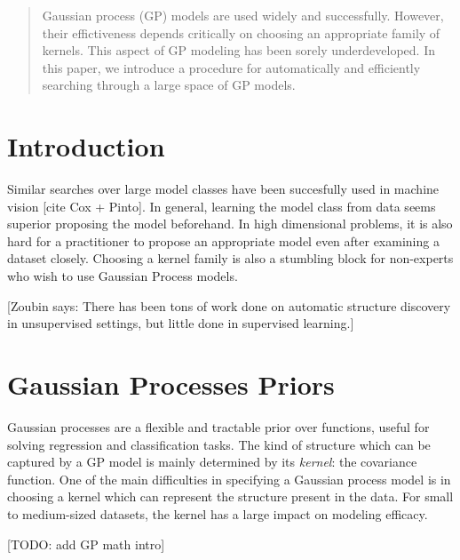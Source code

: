 \documentclass[twoside]{article}
\begin{document}


\begin{abstract}
Gaussian process (GP) models are used widely and successfully.  However, their effictiveness depends critically on choosing an appropriate family of kernels.  This aspect of GP modeling has been sorely underdeveloped.  In this paper, we introduce a procedure for automatically and efficiently searching through a large space of GP models.
\end{abstract}

\section{Introduction}

Similar searches over large model classes have been succesfully used in machine vision [cite Cox + Pinto].  In general, learning the model class from data seems superior proposing the model beforehand.  In high dimensional problems, it is also hard for a practitioner to propose an appropriate model even after examining a dataset closely.  Choosing a kernel family is also a stumbling block for non-experts who wish to use Gaussian Process models.

[Zoubin says:  There has been tons of work done on automatic structure discovery in unsupervised settings, but little done in supervised learning.]

\section{Gaussian Processes Priors}

Gaussian processes are a flexible and tractable prior over functions, useful for solving regression and classification tasks\cite{rasmussen38gaussian}.  The kind of structure which can be captured by a GP model is mainly determined by its \emph{kernel}: the covariance function.  One of the main difficulties in specifying a Gaussian process model is in choosing a kernel which can represent the structure present in the data.  For small to medium-sized datasets, the kernel has a large impact on modeling efficacy.


[TODO: add GP math intro]
\end{document}
